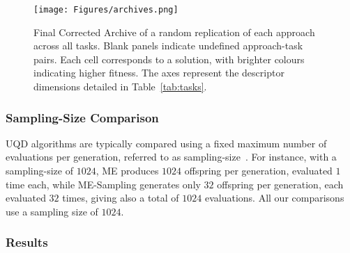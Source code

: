 \begin{figure}[t!]
  \centering
  \texttt{[image: Figures/archives.png]}
  \caption{
    Final Corrected Archive of a random replication of each approach across all tasks. Blank panels indicate undefined approach-task pairs. 
    Each cell corresponds to a solution, with brighter colours indicating higher fitness. The axes represent the descriptor dimensions detailed in Table~\ref{tab:tasks}.
  }
  \label{fig:archives}
  \vspace{-1mm}
\end{figure}

\subsubsection{Sampling-Size Comparison} \label{sec:sampling_size}
UQD algorithms are typically compared using a fixed maximum number of evaluations per generation, referred to as sampling-size~\cite{flageat2023uncertain}.
For instance, with a sampling-size of $1024$, ME produces $1024$ offspring per generation, evaluated $1$ time each, while ME-Sampling generates only $32$ offspring per generation, each evaluated $32$ times, giving also a total of $1024$ evaluations. All our comparisons use a sampling size of $1024$.



\subsubsection{Results}

